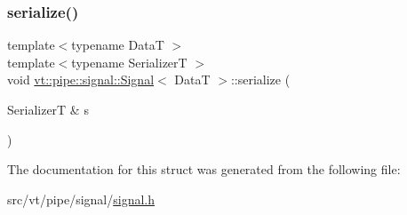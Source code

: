 \mbox{\label{structvt_1_1pipe_1_1signal_1_1_signal_a6b39c1352116ba4464740c62d340fffa}} 
\subsubsection{\texorpdfstring{serialize()}{serialize()}}
{\footnotesize\ttfamily template$<$typename DataT $>$ \\
template$<$typename SerializerT $>$ \\
void \hyperlink{structvt_1_1pipe_1_1signal_1_1_signal}{vt\+::pipe\+::signal\+::\+Signal}$<$ DataT $>$\+::serialize (\begin{DoxyParamCaption}\item[{SerializerT \&}]{s }\end{DoxyParamCaption})\hspace{0.3cm}{\ttfamily [inline]}}



The documentation for this struct was generated from the following file\+:\begin{DoxyCompactItemize}
\item 
src/vt/pipe/signal/\hyperlink{signal_8h}{signal.\+h}\end{DoxyCompactItemize}
